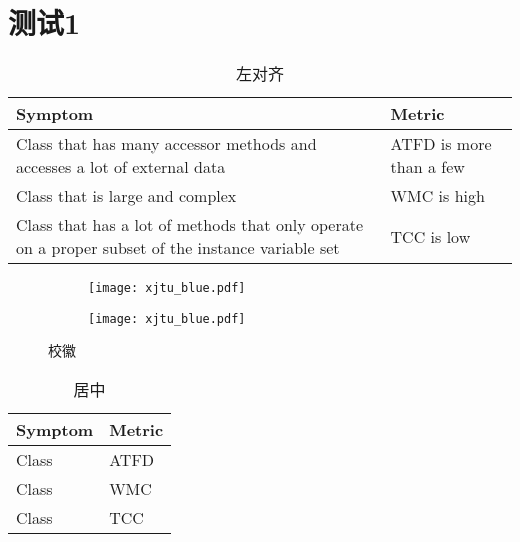 \chapter{测试1}

\begin{table}[H]
    \caption{左对齐}
    \begin{tabularx}{\textwidth}{XX}
    \toprule
        \textbf{Symptom} & \textbf{Metric} \\
    \midrule
        Class that has many accessor methods and accesses a lot of external data & ATFD is more than a few\\
        Class that is large and complex & WMC is high\\
        Class that has a lot of methods that only operate on a proper subset of the instance variable set & TCC is low\\
    \bottomrule
    \end{tabularx}
\end{table}

\begin{figure}[H]
    \begin{subfigure}[b]{0.49\linewidth}
        \centering
        \texttt{[image: xjtu\_blue.pdf]}
    \end{subfigure}
    \begin{subfigure}[b]{0.49\linewidth}
        \centering
        \texttt{[image: xjtu\_blue.pdf]}
        \label{subfig:icon}
    \end{subfigure}
    \caption{校徽}
\end{figure}


\begin{table}[H]
    \caption{居中}
    \begin{tabularx}{\textwidth}{YY}
    \toprule
        \textbf{Symptom} & \textbf{Metric} \\
    \midrule
        Class  & ATFD \\
        Class  & WMC \\
        Class  & TCC \\
    \bottomrule
    \end{tabularx}
\end{table}



